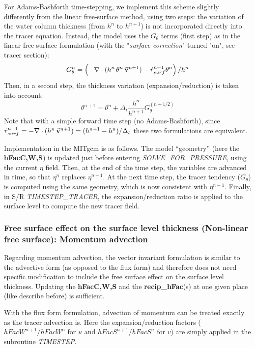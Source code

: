 For Adams-Bashforth time-stepping, we implement this scheme slightly
differently from the linear free-surface method, using two steps: the
variation of the water column thickness (from $h^n$ to $h^{n+1}$) is
not incorporated directly into the tracer equation.  Instead, the
model uses the $G_\theta$ terms (first step) as in the linear free
surface formulation (with the "{\it surface correction}" turned "on",
see tracer section):
$$
G_\theta^n = \left(- \nabla \cdot (h^n \, \theta^n \, \vec{\bf v}^{n+1}) 
         - \dot{r}_{surf}^{n+1} \theta^n \right) / h^n
$$
Then, in a second step, the thickness variation (expansion/reduction)
is taken into account:
$$
\theta^{n+1} = \theta^n + \Delta_t \frac{h^n}{h^{n+1}} G_\theta^{(n+1/2)} 
$$
Note that with a simple forward time step (no Adams-Bashforth), 
since
$
\dot{r}_{surf}^{n+1} 
= - \nabla \cdot (h^n \, \vec{\bf v}^{n+1} ) = (h^{n+1} - h^{n})
/ \Delta_t
$
these two formulations are equivalent. 

Implementation in the MITgcm is as follows.  The model ``geometry''
(here the {\bf hFacC,W,S}) is updated just before entering {\it
SOLVE\_FOR\_PRESSURE}, using the current $\eta$ field.  Then, at the
end of the time step, the variables are advanced in time, so that
$\eta^n$ replaces $\eta^{n-1}$.  At the next time step, the tracer
tendency ($G_\theta$) is computed using the same geometry, which is
now consistent with $\eta^{n-1}$.  Finally, in S/R {\it
TIMESTEP\_TRACER}, the expansion/reduction ratio is applied to the
surface level to compute the new tracer field.


\subsubsection{Free surface effect on the surface level thickness
(Non-linear free surface): Momentum advection}     
\label{sect:freesurf-momentum-advection}

Regarding momentum advection,
the vector invariant formulation is similar to the
advective form (as opposed to the flux form) and therefore
does not need specific modification to include the 
free surface effect on the surface level thickness.
Updating the {\bf hFacC,W,S} and the {\bf recip\_hFac}(s) 
at one given place (like describe before) is sufficient.

With the flux form formulation, advection of momentum
can be treated exactly as the tracer advection is.
Here the expansion/reduction factors ($hFacW^{n+1}/hFacW^n$ for $u$
and $hFacS^{n+1}/hFacS^n$ for $v$) are simply applied in the
subroutine {\it TIMESTEP}.

